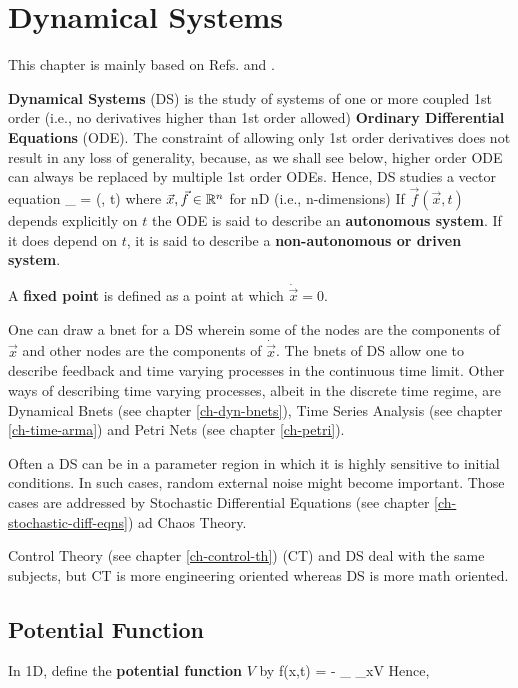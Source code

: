 \chapter{Dynamical Systems}
\label{ch-dynamical-sys}

This chapter is mainly based on 
Refs.\cite{dynamical-fuchs} and \cite{wiki-phase-plane}.

{\bf Dynamical Systems} (DS)
is the study of systems of one or more
coupled 1st order (i.e., no derivatives higher than 1st order allowed) {\bf Ordinary Differential Equations} (ODE).
The constraint of allowing only 1st order
derivatives does not result in any loss of generality,
because, as we shall see below, higher order ODE
can always be replaced by multiple 1st order ODEs.
Hence, DS studies a vector equation
\beq
{}_{}
= (, t)
\eeq
where $\vec{x},  \vec{f}\in{ \mathbb{R}}^n$ for nD (i.e., n-dimensions)
If $\vec{f}(\vec{x},t)$
depends explicitly on $t$ 
the ODE is said
to describe an {\bf autonomous
system}.
If it does depend on $t$,
it is said to describe a
{\bf non-autonomous or driven
system}.

A {\bf fixed point} is defined as a point
at which $\dot{\vec{x}}=0$.

One can draw a bnet for a DS wherein some
of the nodes are the components of $\vec{x}$
and other nodes are the components of $\dot{\vec{x}}$.
The bnets of DS allow one to describe feedback and time
varying processes in the continuous time limit.
Other ways of describing time varying processes, albeit in the
discrete time regime, are Dynamical Bnets (see chapter \ref{ch-dyn-bnets}),
Time Series Analysis (see chapter \ref{ch-time-arma})
and Petri Nets (see chapter \ref{ch-petri}).


Often a DS can be in a parameter region
in which it is highly sensitive to initial conditions. In such cases, random external noise 
might become important. Those cases are 
addressed by Stochastic Differential Equations (see chapter \ref{ch-stochastic-diff-eqns})
ad Chaos Theory.

Control Theory (see chapter \ref{ch-control-th}) (CT)
and DS deal with the same subjects, but CT is more
engineering oriented whereas DS is more math oriented.
\section{Potential Function}

In 1D, define the {\bf potential function} $V$ by
\beq
f(x,t) = -
_{ \partial_xV}
\eeq
Hence,

